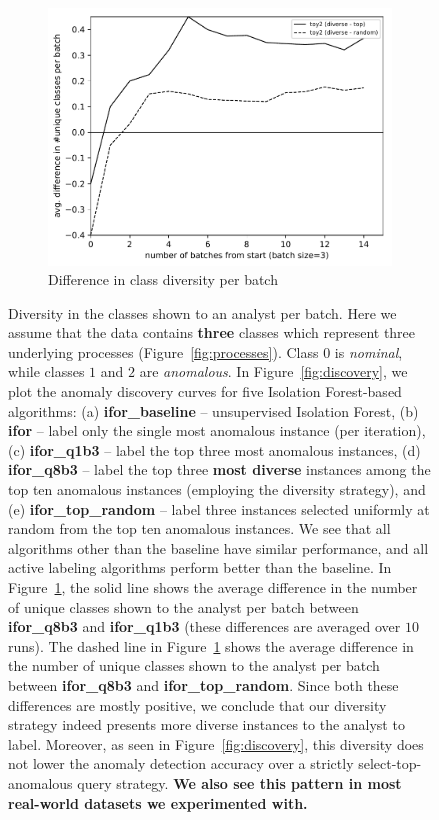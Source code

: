 \documentclass{article} %
\begin{document}
\begin{figure}
	\begin{subfigure}[b]{0.48\textwidth}
		\includegraphics[width=\textwidth]{results_diff_classes_toy2}
		\caption{Difference in class diversity per batch}
		\label{fig:class_diff}
	\end{subfigure}
	\caption{Diversity in the classes shown to an analyst per batch. Here we assume that the data contains \textbf{three} classes which represent three underlying processes (Figure~\ref{fig:processes}). Class $0$ is \emph{nominal}, while classes $1$ and $2$ are \emph{anomalous}. In Figure~\ref{fig:discovery}, we plot the anomaly discovery curves for five Isolation Forest-based algorithms: (a) \textbf{ifor\_baseline} -- unsupervised Isolation Forest, (b) \textbf{ifor} -- label only the single most anomalous instance (per iteration), (c) \textbf{ifor\_q1b3} -- label the top three most anomalous instances, (d) \textbf{ifor\_q8b3} -- label the top three \textbf{most diverse} instances among the top ten anomalous instances (employing the diversity strategy), and (e) \textbf{ifor\_top\_random} -- label three instances selected uniformly at random from the top ten anomalous instances. We see that all algorithms other than the baseline have similar performance, and all active labeling algorithms perform better than the baseline. In Figure~\ref{fig:class_diff}, the solid line shows the average difference in the number of unique classes shown to the analyst per batch between \textbf{ifor\_q8b3} and \textbf{ifor\_q1b3} (these differences are averaged over $10$ runs). The dashed line in Figure~\ref{fig:class_diff} shows the average difference in the number of unique classes shown to the analyst per batch between \textbf{ifor\_q8b3} and \textbf{ifor\_top\_random}. Since both these differences are mostly positive, we conclude that our diversity strategy indeed presents more diverse instances to the analyst to label. Moreover, as seen in Figure~\ref{fig:discovery}, this diversity does not lower the anomaly detection accuracy over a strictly select-top-anomalous query strategy. \textbf{We also see this pattern in most real-world datasets we experimented with.}} \label{fig:diverse_effect}
\end{figure}
\end{document}

